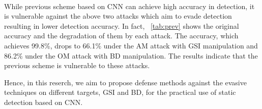 \paragraph*{}
While previous scheme based on CNN can achieve high accuracy in detection, it is vulnerable against the above two attacks which aim to evade detection resulting in lower detection accuracy.
In fact, \tablename~\ref{tab:prev} shows the original accuracy and the degradation of them by each attack.
The accuracy, which achieves 99.8\%, drops to 66.1\% under the AM attack with GSI manipulation and 86.2\% under the OM attack with BD manipulation.
The results indicate that the previous scheme is vulnerable to these attacks.

Hence, in this reserch, we aim to propose defense methods against the evasive techniques on different targets, GSI and BD, for the practical use of static detection based on CNN.

\newpage
